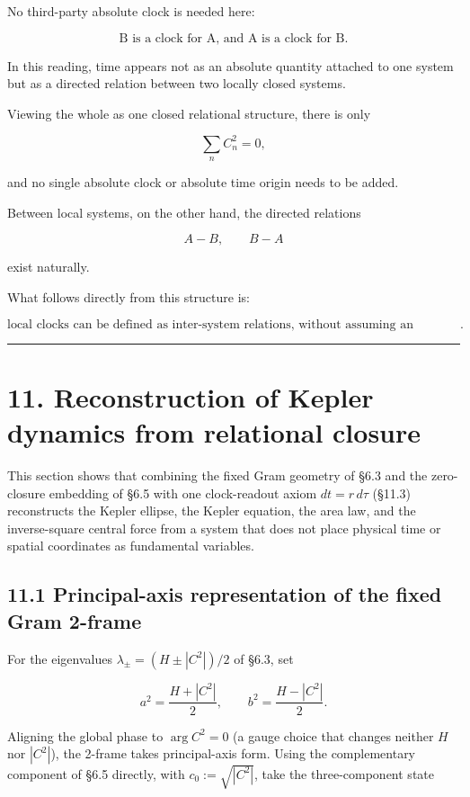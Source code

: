 \documentclass[
  a4paper,
]{article}
\begin{document}
No third-party absolute clock is needed here:

\[
\boxed{
\text{B is a clock for A, and A is a clock for B}
}.
\]

In this reading, time appears not as an absolute quantity attached to
one system but as a directed relation between two locally closed
systems.

Viewing the whole as one closed relational structure, there is only

\[
\sum_n C_n^2=0,
\]

and no single absolute clock or absolute time origin needs to be added.

Between local systems, on the other hand, the directed relations

\[
A-B,\qquad B-A
\]

exist naturally.

What follows directly from this structure is:

\[
\boxed{
\text{local clocks can be defined as inter-system relations, without assuming an absolute clock}
}.
\]

\begin{center}\rule{0.5\linewidth}{0.5pt}\end{center}

\section{11. Reconstruction of Kepler dynamics from relational
closure}\label{reconstruction-of-kepler-dynamics-from-relational-closure}

This section shows that combining the fixed Gram geometry of §6.3 and
the zero-closure embedding of §6.5 with one clock-readout axiom
\(dt=r\,d\tau\) (§11.3) reconstructs the Kepler ellipse, the Kepler
equation, the area law, and the inverse-square central force from a
system that does not place physical time or spatial coordinates as
fundamental variables.

\subsection{11.1 Principal-axis representation of the fixed Gram
2-frame}\label{principal-axis-representation-of-the-fixed-gram-2-frame}

For the eigenvalues \(\lambda_\pm=(H\pm|C^2|)/2\) of §6.3, set

\[
a^2=\frac{H+|C^2|}{2},
\qquad
b^2=\frac{H-|C^2|}{2}.
\]

Aligning the global phase to \(\arg C^2=0\) (a gauge choice that changes
neither \(H\) nor \(|C^2|\)), the 2-frame takes principal-axis form.
Using the complementary component of §6.5 directly, with
\(c_0:=\sqrt{|C^2|}\), take the three-component state
\end{document}
